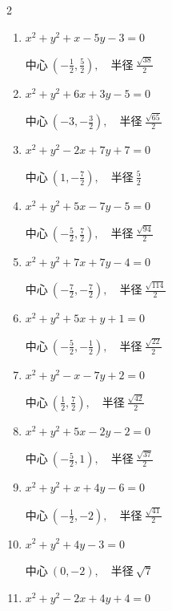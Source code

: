 \begin{multicols}{2}
\begin{enumerate}
\resetques

  \item $x^{2}+y^{2}+x-5y-3=0$

        $\displaystyle 中心\: \left(-\frac{1}{2},\frac{5}{2}\right), \quad 半径 \ \frac{\sqrt{38}}{2}$

  \item $x^{2}+y^{2}+6x+3y-5=0$

        $\displaystyle 中心\: \left(-3,-\frac{3}{2}\right), \quad 半径 \ \frac{\sqrt{65}}{2}$

  \item $x^{2}+y^{2}-2x+7y+7=0$

        $\displaystyle 中心\: \left(1,-\frac{7}{2}\right), \quad 半径 \ \frac{5}{2}$

  \item $x^{2}+y^{2}+5x-7y-5=0$

        $\displaystyle 中心\: \left(-\frac{5}{2},\frac{7}{2}\right), \quad 半径 \ \frac{\sqrt{94}}{2}$

  \item $x^{2}+y^{2}+7x+7y-4=0$

        $\displaystyle 中心\: \left(-\frac{7}{2},-\frac{7}{2}\right), \quad 半径 \ \frac{\sqrt{114}}{2}$

  \item $x^{2}+y^{2}+5x+y+1=0$

        $\displaystyle 中心\: \left(-\frac{5}{2},-\frac{1}{2}\right), \quad 半径 \ \frac{\sqrt{22}}{2}$

  \item $x^{2}+y^{2}-x-7y+2=0$

        $\displaystyle 中心\: \left(\frac{1}{2},\frac{7}{2}\right), \quad 半径 \ \frac{\sqrt{42}}{2}$

  \item $x^{2}+y^{2}+5x-2y-2=0$

        $\displaystyle 中心\: \left(-\frac{5}{2},1\right), \quad 半径 \ \frac{\sqrt{37}}{2}$

  \item $x^{2}+y^{2}+x+4y-6=0$

        $\displaystyle 中心\: \left(-\frac{1}{2},-2\right), \quad 半径 \ \frac{\sqrt{41}}{2}$

  \item $x^{2}+y^{2}+4y-3=0$

        $\displaystyle 中心\: \left(0,-2\right), \quad 半径 \ \sqrt{7}$

  \item $x^{2}+y^{2}-2x+4y+4=0$


\end{enumerate}
\end{multicols}
